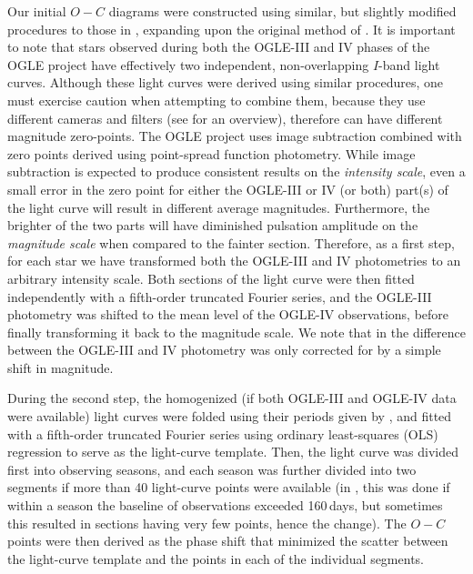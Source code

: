 \documentclass[twocolumn,times]{aastex63}
\begin{document}
Our initial $O-C$ diagrams were constructed using similar, but slightly modified procedures to those in \citet{2015MNRAS.449L.113H},
expanding upon the original method of \citet{1919AN....210...17H}.
It is important to note that stars observed during both the OGLE-III and IV phases of the OGLE project
have effectively two independent, non-overlapping $I$-band light curves. Although these light curves were derived using similar procedures,
one must exercise caution when attempting to combine them, because they use different cameras and filters (see \citealt{2015AcA....65....1U} for an overview),
therefore can have different magnitude zero-points.
The OGLE project uses image subtraction combined with zero points derived using
point-spread function photometry. While image subtraction is expected to produce consistent results on the \textit{intensity scale},
even a small error in the zero point for either the OGLE-III or IV (or both) part(s) of the light curve will result in
different average magnitudes. Furthermore, the brighter of the two parts will have diminished pulsation amplitude on the \textit{magnitude scale}
when compared to the fainter section.
Therefore, as a first step, for each star we have transformed both the OGLE-III and IV photometries to an arbitrary intensity scale.
Both sections of the light curve were then fitted independently with a fifth-order truncated Fourier series, and the OGLE-III photometry was shifted
to the mean level of the OGLE-IV observations, before finally transforming it back to the magnitude scale.
We note that in \citet{2015MNRAS.449L.113H} the difference between the OGLE-III and IV
photometry was only corrected for by a simple shift in magnitude.


During the second step, the homogenized (if both OGLE-III and OGLE-IV data were available) light curves were folded using their
periods given by \citet{2014AcA....64..177S}, and fitted with a fifth-order truncated Fourier series using ordinary least-squares (OLS)
regression to serve as the light-curve template. Then, the light curve
was divided first into observing seasons, and each season was further divided into two segments if more than 40 light-curve points were
available (in \citealt{2015MNRAS.449L.113H}, this was done if within a season the baseline of observations exceeded 160\,days,
but sometimes this resulted in sections having very few points, hence the change).
The $O-C$ points were then derived as the phase shift that minimized the scatter between the light-curve template and the points
in each of the individual segments.
\end{document}
